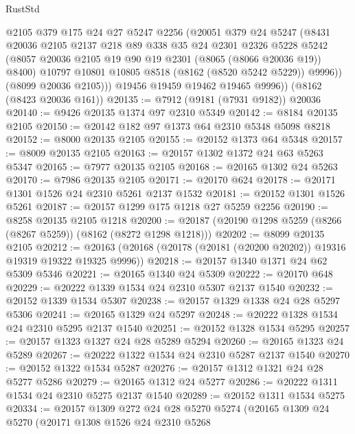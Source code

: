 \begin{lexlean}{RustStd}
\begin{coremodule}
            @2105
            @379
            @175
            @24
            @27
            @5247
            @2256
            (@20051
              @379
              @24
              @5247
              (@8431
                @20036
                @2105
                @2137
                @218
                @89
                @338
                @35
                @24
                @2301
                @2326
                @5228
                @5242
                (@8057 @20036 @2105 @19 @90 @19 @2301 (@8065 (@8066 @20036 @19)) @8400)
                @10797
                @10801
                @10805
                @8518
                (@8162 (@8520 @5242 @5229))
                @9996))
            (@8099 @20036 @2105)))
        @19456
        @19459
        @19462
        @19465
        @9996))
    (@8162 (@8423 @20036 @161))
@20135 := @7912 (@9181 (@7931 @9182)) @20036
@20140 := @9426 @20135 @1374 @97 @2310 @5349
@20142 := @8184 @20135 @2105
@20150 := @20142 @182 @97 @1373 @64 @2310 @5348 @5098 @8218
@20152 := @8000 @20135 @2105
@20155 := @20152 @1373 @64 @5348
@20157 := @8009 @20135 @2105
@20163 := @20157 @1302 @1372 @24 @63 @5263 @5347
@20165 := @7977 @20135 @2105
@20168 := @20165 @1302 @24 @5263
@20170 := @7986 @20135 @2105
@20171 := @20170 @624
@20178 := @20171 @1301 @1526 @24 @2310 @5261 @2137 @1532
@20181 := @20152 @1301 @1526 @5261
@20187 := @20157 @1299 @175 @1218 @27 @5259 @2256
@20190 := @8258 @20135 @2105 @1218
@20200 := @20187 (@20190 @1298 @5259 (@8266 (@8267 @5259)) (@8162 (@8272 @1298 @1218)))
@20202 := @8099 @20135 @2105
@20212 := @20163 (@20168 (@20178 (@20181 (@20200 @20202)) @19316 @19319 @19322 @19325 @9996))
@20218 := @20157 @1340 @1371 @24 @62 @5309 @5346
@20221 := @20165 @1340 @24 @5309
@20222 := @20170 @648
@20229 := @20222 @1339 @1534 @24 @2310 @5307 @2137 @1540
@20232 := @20152 @1339 @1534 @5307
@20238 := @20157 @1329 @1338 @24 @28 @5297 @5306
@20241 := @20165 @1329 @24 @5297
@20248 := @20222 @1328 @1534 @24 @2310 @5295 @2137 @1540
@20251 := @20152 @1328 @1534 @5295
@20257 := @20157 @1323 @1327 @24 @28 @5289 @5294
@20260 := @20165 @1323 @24 @5289
@20267 := @20222 @1322 @1534 @24 @2310 @5287 @2137 @1540
@20270 := @20152 @1322 @1534 @5287
@20276 := @20157 @1312 @1321 @24 @28 @5277 @5286
@20279 := @20165 @1312 @24 @5277
@20286 := @20222 @1311 @1534 @24 @2310 @5275 @2137 @1540
@20289 := @20152 @1311 @1534 @5275
@20334 := @20157
    @1309
    @272
    @24
    @28
    @5270
    @5274
    (@20165
      @1309
      @24
      @5270
      (@20171
        @1308
        @1526
        @24
        @2310
        @5268

\end{coremodule}
\end{lexlean}
